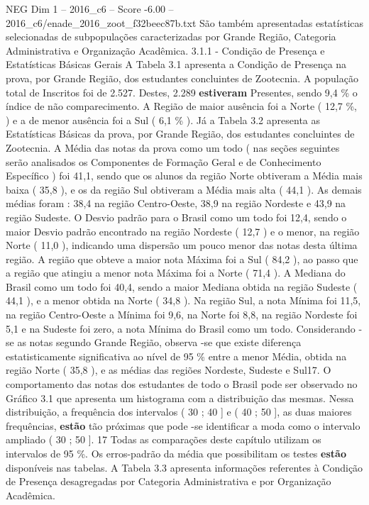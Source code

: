 \begin{textsample}{NEG Dim 1 – 2016\_c6 – Score -6.00 – 2016\_c6/enade\_2016\_zoot\_f32beec87b.txt}
São também apresentadas estatísticas selecionadas de subpopulações caracterizadas por Grande Região, Categoria Administrativa e Organização Acadêmica. 3.1.1 - Condição de Presença e Estatísticas Básicas Gerais A Tabela 3.1 apresenta a Condição de Presença na prova, por Grande Região, dos estudantes concluintes de Zootecnia.
A população total de Inscritos foi de 2.527.
Destes, 2.289 \textbf{estiveram} Presentes, sendo 9,4 \% o índice de não comparecimento.
A Região de maior ausência foi a Norte ( 12,7 \%, ) e a de menor ausência foi a Sul ( 6,1 \% ).
Já a Tabela 3.2 apresenta as Estatísticas Básicas da prova, por Grande Região, dos estudantes concluintes de Zootecnia.
A Média das notas da prova como um todo ( nas seções seguintes serão analisados os Componentes de Formação Geral e de Conhecimento Específico ) foi 41,1, sendo que os alunos da região Norte obtiveram a Média mais baixa ( 35,8 ), e os da região Sul obtiveram a Média mais alta ( 44,1 ).
As demais médias foram : 38,4 na região Centro-Oeste, 38,9 na região Nordeste e 43,9 na região Sudeste.
O Desvio padrão para o Brasil como um todo foi 12,4, sendo o maior Desvio padrão encontrado na região Nordeste ( 12,7 ) e o menor, na região Norte ( 11,0 ), indicando uma dispersão um pouco menor das notas desta última região.
A região que obteve a maior nota Máxima foi a Sul ( 84,2 ), ao passo que a região que atingiu a menor nota Máxima foi a Norte ( 71,4 ).
A Mediana do Brasil como um todo foi 40,4, sendo a maior Mediana obtida na região Sudeste ( 44,1 ), e a menor obtida na Norte ( 34,8 ).
Na região Sul, a nota Mínima foi 11,5, na região Centro-Oeste a Mínima foi 9,6, na Norte foi 8,8, na região Nordeste foi 5,1 e na Sudeste foi zero, a nota Mínima do Brasil como um todo.
Considerando -se as notas segundo Grande Região, observa -se que existe diferença estatisticamente significativa ao nível de 95 \% entre a menor Média, obtida na região Norte ( 35,8 ), e as médias das regiões Nordeste, Sudeste e Sul17.
O comportamento das notas dos estudantes de todo o Brasil pode ser observado no Gráfico 3.1 que apresenta um histograma com a distribuição das mesmas.
Nessa distribuição, a frequência dos intervalos ( 30 ; 40 ] e ( 40 ; 50 ], as duas maiores frequências, \textbf{estão} tão próximas que pode -se identificar a moda como o intervalo ampliado ( 30 ; 50 ]. 17 Todas as comparações deste capítulo utilizam os intervalos de 95 \%.
Os erros-padrão da média que possibilitam os testes \textbf{estão} disponíveis nas tabelas.
A Tabela 3.3 apresenta informações referentes à Condição de Presença desagregadas por Categoria Administrativa e por Organização Acadêmica.

\end{textsample}
